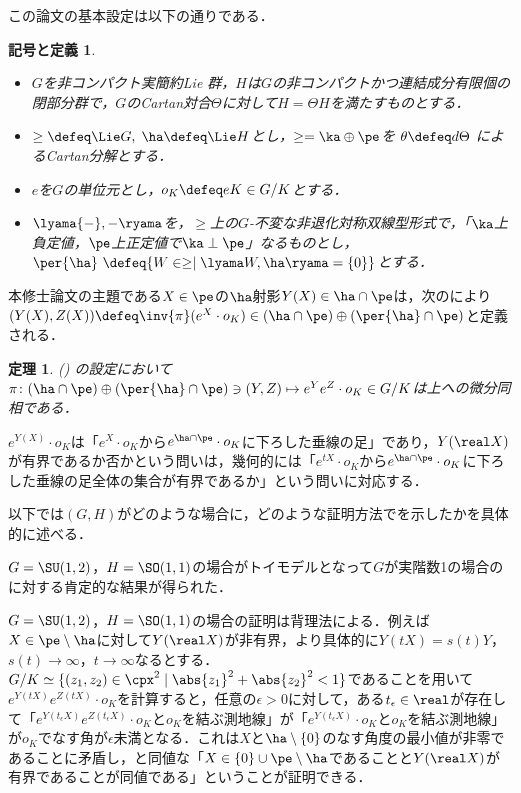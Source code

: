 \documentclass[12pt,dvipdfmx,uplatex]{jsarticle}
\newcounter{countabst}
\newtheorem{nttdef-a}[countabst]{記号と定義}
\newtheorem{thm-a}[countabst]{定理}
\begin{document}
この論文の基本設定は以下の通りである．
\begin{nttdef-a}\label{nttdef:setting}
  \leavevmode\vspace{-1em}
  \begin{itemize}
  \item $G$を非コンパクト実簡約Lie 群，$H$は$G$の非コンパクトかつ連結成分有限個の閉部分群で，$G$のCartan対合$\Theta$に対して$H = \Theta H$を満たすものとする．
  \item $\ge \defeq \Lie G,\; \ha \defeq \Lie H$とし，$\ge = \ka\oplus \pe$を $\theta \defeq d\Theta$ によるCartan分解とする．
  \item  $e$を$G$の単位元とし，$o_K \defeq eK\in G/K$とする．
  \item $\lyama{-},{-} \ryama$を，$\ge$上の$G$-不変な非退化対称双線型形式で，「$\ka$上負定値，$\pe$上正定値で$\ka\perp \pe$」なるものとし，$\per{\ha}\ \defeq \{W\in \ge\mid \lyama W, \ha\ryama = \{0\}\} $とする．
  \end{itemize}  
\end{nttdef-a}
\vspace{-0.5em}

本修士論文の主題である$X\in \pe$の$\ha$射影$Y(X)\in \ha\cap \pe $は，次のにより${(Y(X), Z(X))\defeq \inv{\pi}(e^X\cdot o_K)\in (\ha\cap\pe)\oplus (\per{\ha}\cap \pe)}$と定義される．
\begin{thm-a}(\cite[Lemma~6.1]{kob89}\label{thm:kob89-lem6.1})
  の設定において$\pi\colon  (\ha\cap\pe)\oplus (\per{\ha}\cap \pe) \ni (Y, Z)\mapsto e^{Y}e^{Z}\cdot o_K \in G/K $は上への微分同相である．
\end{thm-a}

$e^{Y(X)}\cdot o_K$は「$e^{X}\cdot o_K$から$e^{\ha\cap\pe}\cdot o_K $に下ろした垂線の足」であり，$Y(\real X) $が有界であるか否かという問いは，幾何的には「$e^{tX}\cdot o_K$から$e^{\ha\cap\pe}\cdot o_K $に下ろした垂線の足全体の集合が有界であるか」という問いに対応する．

以下では$(G,H) $がどのような場合に，どのような証明方法でを示したかを具体的に述べる．

$G = \SU(1,2) $，$H= \SO(1,1)$の場合がトイモデルとなって$G$が実階数1の場合のに対する肯定的な結果が得られた．

$G = \SU(1,2) $，$H= \SO(1,1)$の場合の証明は背理法による．例えば$X\in \pe\setminus\ha $に対して$Y(\real X) $が非有界，より具体的に$Y(t X) = s(t) Y$，$s(t) \to \infty$，$t\to \infty $なるとする．$G/K \simeq \{(z_1,z_2)\in \cpx^2 \mid \abs{z_1}^2 + \abs{z_2}^2 < 1 \} $であることを用いて$e^{Y(tX)}e^{Z(tX)}\cdot o_K $を計算すると，任意の$\epsilon > 0$に対して，ある$t_{\epsilon}\in \real$が存在して「$ e^{Y(t_{\epsilon} X)}e^{Z(t_{\epsilon} X)}\cdot o_K $と$o_K$を結ぶ測地線」が「$e^{Y(t_{\epsilon} X)}\cdot o_K $と$o_K$を結ぶ測地線」が$o_K$でなす角が$\epsilon $未満となる．これは$X$と$\ha\setminus\{0\} $のなす角度の最小値が非零であることに矛盾し，と同値な「$X\in \{0\}\cup \pe\setminus\ha $であることと$ Y(\real X) $が有界であることが同値である」ということが証明できる．
\end{document}
